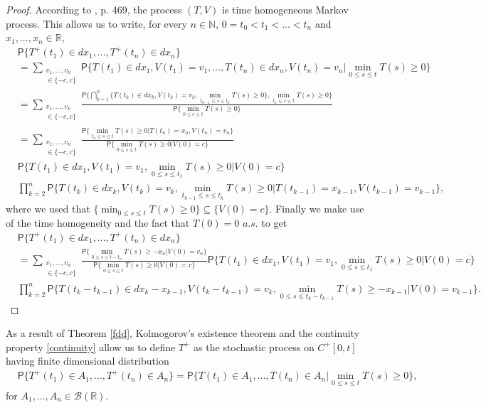 \documentclass{article}
\theoremstyle{definition}
\numberwithin{equation}{section}
\begin{document}
\begin{proof}
According to \cite{EK 1986}, p. 469,  the process $(T,V)$ is time homogeneous Markov process. This allows us to write, for every $n \in \mathbb{N}$, $0=t_0<t_1<...<t_n$ and $x_1,...,x_n \in \mathbb{R}$,
\begin{align*}
&\mathsf{P}\{T^+(t_1)\in dx_1,...,T^+(t_n) \in dx_n\}\\
&= \sum_{\substack{v_1,...,v_n\\\in \{-c,c\}}}\mathsf{P}\{T(t_1)\in dx_1,V(t_1) = v_1,...,T(t_n) \in dx_n,V(t_n) = v_n|\min_{0\leq s\leq t}T(s)\geq 0\}\\
&=\sum_{\substack{v_1,...,v_n\\\in \{-c,c\}}}\frac{\mathsf{P}\{\bigcap_{k=1}^n \{T(t_k)\in dx_k,V(t_k) = v_k,\min_{t_{k-1}\leq s\leq t_k}T(s)\geq 0\},\min_{t_n\leq s\leq t}T(s)\geq 0\}}{\mathsf{P}\{\min_{0\leq s\leq t}T(s)\geq 0\}}\\
&=\sum_{\substack{v_1,...,v_n\\\in \{-c,c\}}}\frac{\mathsf{P}\{\min_{t_n\leq s\leq t}T(s)\geq 0|T(t_n) = x_n,V(t_n) = v_n\}}{\mathsf{P}\{\min_{0\leq s\leq t}T(s)\geq 0|V(0) = c\}}\\&\mathsf{P}\{T(t_1)\in dx_1,V(t_1) = v_1,\min_{0\leq s\leq t_1}T(s)\geq 0|V(0) = c\}\\
&\prod_{k=2}^{n}\mathsf{P}\{T(t_k)\in dx_k,V(t_k) = v_k,\min_{t_{k-1}\leq s\leq t_k}T(s)\geq 0|T(t_{k-1}) = x_{k-1},V(t_{k-1}) = v_{k-1}\},
\end{align*}
where we used that $\{\min_{0\leq s \leq t} T(s) \geq 0\} \subseteq \{V(0) = c\}$. Finally we make use of the time homogeneity and the fact that $T(0) = 0$ $a.s.$ to get
\begin{align*}
&\mathsf{P}\{T^+(t_1)\in dx_1,...,T^+(t_n) \in dx_n\}\\
&=\sum_{\substack{v_1,...,v_n\\\in \{-c,c\}}}\frac{\mathsf{P}\{\min_{0\leq s\leq t-t_n}T(s)\geq -x_n|V(0) = v_n\}}{\mathsf{P}\{\min_{0\leq s\leq t}T(s)\geq 0|V(0) = c\}}\mathsf{P}\{T(t_1)\in dx_1,V(t_1) = v_1,\min_{0\leq s\leq t_1}T(s)\geq 0|V(0) = c\}\\
&\prod_{k=2}^{n}\mathsf{P}\{T(t_k-t_{k-1})\in dx_k-x_{k-1},V(t_k-t_{k-1}) = v_k,\min_{0\leq s\leq t_k-t_{k-1}}T(s)\geq -x_{k-1}|V(0) = v_{k-1}\}.
\end{align*}
\end{proof}
As a result of Theorem \ref{fdd}, Kolmogorov's existence theorem and the  continuity property \eqref{continuity} allow us to define $T^+$ as the stochastic process on $C^+[0,t]$ having finite dimensional distribution
\begin{align}\label{fdds}
&\mathsf{P}\{T^+(t_1)\in A_1,...,T^+(t_n) \in A_n\}= \mathsf{P}\{T(t_1)\in A_1,...,T(t_n) \in A_n|\min_{0\leq s\leq t}T(s)\geq 0\},
\end{align}
for $A_1,...,A_n \in \mathcal{B}(\mathbb{R})$.
\end{document}
